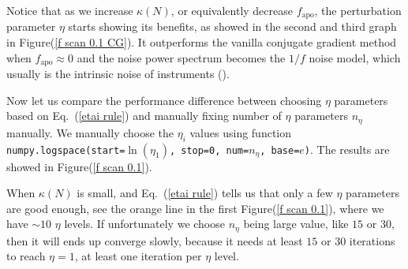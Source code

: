 \documentclass[twocolumn,linenumbers]{aastex631}
\begin{document}
Notice that as we increase $\kappa(N)$, or equivalently decrease
$f_{\text{apo}}$, the perturbation parameter $\eta$ starts showing its 
benefits, as showed in the second and third graph in Figure(\ref{f scan 0.1 CG}).
It outperforms the vanilla conjugate gradient method when 
$f_{\text{apo}} \approx 0$ and the noise power spectrum becomes the $1/f$ noise model,
which usually is the intrinsic noise of instruments (\cite{1997PhRvD..56.4514T}).
%


Now let us compare the performance difference between choosing $\eta$
parameters based on Eq.~(\ref{etai rule})
and manually fixing number of $\eta$ parameters $n_{\eta}$ manually.
We manually choose the $\eta_i$ values using function
\texttt{numpy.logspace(start=$\ln(\eta_1)$, stop=0, num=$n_{\eta}$, base=$e$)}.
The results are showed in Figure(\ref{f scan 0.1}).

When $\kappa(N)$ is small, and Eq.~(\ref{etai rule}) tells us that only a few
$\eta$ parameters are good enough, see the orange line in the first Figure(\ref{f scan 0.1}),
where we have $\sim 10$ $\eta$ levels.
If unfortunately we choose $n_{\eta}$ being large value, like $15$ or $30$,
then it will ends up converge slowly, because it needs at least $15$ or $30$
iterations to reach $\eta=1$, at least one iteration per $\eta$ level.
\end{document}
